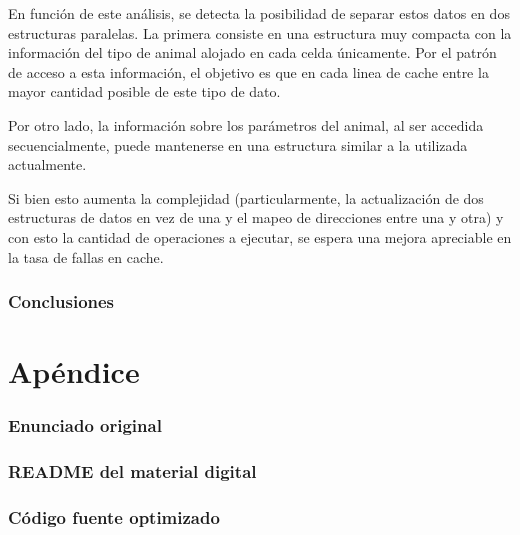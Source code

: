\documentclass[a4paper,11pt]{article}
\begin{document}
En función de este análisis, se detecta la posibilidad de separar estos datos
en dos estructuras paralelas. La primera consiste en una estructura muy
compacta con la información del tipo de animal alojado en cada celda
únicamente. Por el patrón de acceso a esta información, el objetivo es que en
cada linea de cache entre la mayor cantidad posible de este tipo de dato.

Por otro lado, la información sobre los parámetros del animal, al ser accedida
secuencialmente, puede mantenerse en una estructura similar a la
utilizada actualmente.

Si bien esto aumenta la complejidad (particularmente, la actualización de dos
estructuras de datos en vez de una y el mapeo de direcciones entre una y otra)
y con esto la cantidad de operaciones a ejecutar, se espera una mejora
apreciable en la tasa de fallas en cache.

\section{Conclusiones}


\clearpage

\part{Apéndice}
\appendix

\section{Enunciado original}\label{sec:enunciado}


\clearpage
\section{README del material digital}\label{sec:readme}


\clearpage
\section{Código fuente optimizado}\label{sec:source}
\clearpage

\end{document}

